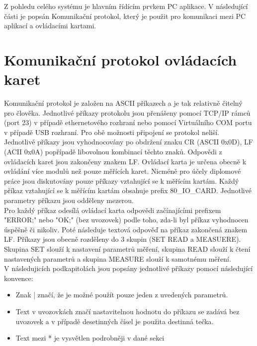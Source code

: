 Z pohledu celého systému je hlavním řídícím prvkem PC aplikace. V následující části je popsán Komunikační
protokol, který je použit pro komunikaci mezi PC aplikací a ovládacími kartami.

\section{Komunikační protokol ovládacích karet}
Komunikační protokol je založen na ASCII příkazech a je tak relativně čitelný pro člověka.
Jednotlivé příkazy protokolu jsou přenášeny pomocí TCP/IP rámců (port 23) v případě ethernetového rozhraní nebo
pomocí Virtuálního COM portu v případě USB rozhraní. Pro obě možnosti připojení se protokol neliší.\\

Jednotlivé příkazy jsou vyhodnocovány po obdržení znaku CR (ASCII 0x0D), LF (ACII 0x0A) popřípadě libovolnou kombinací těchto znaků. Odpovědi
z ovládacích karet jsou zakončeny znakem LF. Ovládací karta je určena obecně k ovládání více modulů než pouze měřících karet. Nicméně pro účely
diplomové práce jsou diskutovány pouze příkazy vztahující se k měřícím kartám. Každý příkaz vztahující se k měřícím kartám obsahuje prefix 80\_IO\_CARD.
Jednotlivé parametry příkazu jsou odděleny mezerou.\\

Pro každý příkaz odesílá ovládací karta odpovědi začínajícími prefixem "ERROR;" nebo "OK;" (bez uvozovek) podle toho, zda-li byl příkaz vyhodnocen úspěšně či nikoliv.
Poté následuje textová odpověď na příkaz zakončená znakem LF.
Příkazy jsou obecně rozděleny do 3 skupin (SET READ a MEASUERE). Skupina SET slouží k nastavení parametrů měření, skupina READ slouží k čtení nastavených parametrů
a skupina MEASURE slouží k samotnému měření.\\

V následujicích podkapitolách jsou popsány jednotlivé příkazy pomocí následující konvence:
\begin{itemize}
    \item Znak | značí, že je možné použít pouze jeden z uvedených parametrů.
    \item Text v uvozovkách značí nastavitelnou hodnotu do příkazu se zadává bez uvozovek a v případě desetinných čísel je použita destinná tečka.
    \item Text mezi * je vysvětlen podrobněji v dané sekci
    
\end{itemize}

